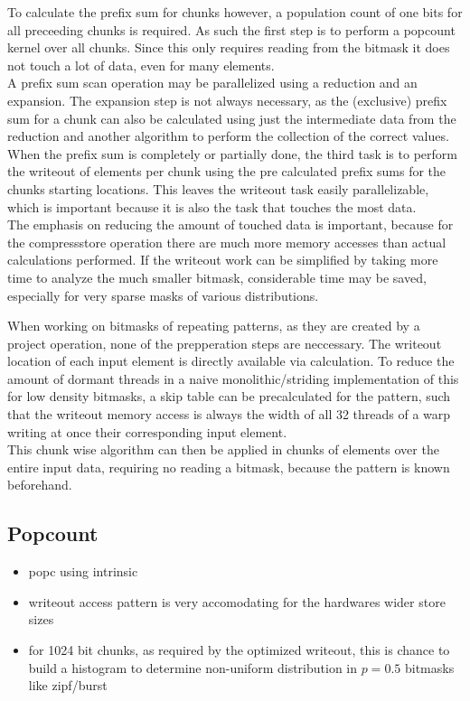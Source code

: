 \documentclass{tudscrreprt}
\begin{document}
		To calculate the prefix sum for chunks however, a population count of one bits for all preceeding chunks is required. As such the first step is to perform a popcount kernel over all chunks. Since this only requires reading from the bitmask it does not touch a lot of data, even for many elements. \\
		
		A prefix sum scan operation may be parallelized using a reduction and an expansion. The expansion step is not always necessary, as the (exclusive) prefix sum for a chunk can also be calculated using just the intermediate data from the reduction and another algorithm to perform the collection of the correct values. \\
		
		When the prefix sum is completely or partially done, the third task is to perform the writeout of elements per chunk using the pre calculated prefix sums for the chunks starting locations. This leaves the writeout task easily parallelizable, which is important because it is also the task that touches the most data. \\
		
		The emphasis on reducing the amount of touched data is important, because for the compressstore operation there are much more memory accesses than actual calculations performed. If the writeout work can be simplified by taking more time to analyze the much smaller bitmask, considerable time may be saved, especially for very sparse masks of various distributions.
	
		When working on bitmasks of repeating patterns, as they are created by a project operation, none of the prepperation steps are neccessary. The writeout location of each input element is directly available via calculation. To reduce the amount of dormant threads in a naive monolithic/striding implementation of this for low density bitmasks, a skip table can be precalculated for the pattern, such that the writeout memory access is always the width of all 32 threads of a warp writing at once their corresponding input element. \\
		This chunk wise algorithm can then be applied in chunks of elements over the entire input data, requiring no reading a bitmask, because the pattern is known beforehand. \\
	
		\subsection{Popcount}
			\begin{itemize}
				\item popc using intrinsic
				\item writeout access pattern is very accomodating for the hardwares wider store sizes
				\item for 1024 bit chunks, as required by the optimized writeout, this is chance to build a histogram to determine non-uniform distribution in $p=0.5$ bitmasks like zipf/burst
			\end{itemize}
		
\end{document}
